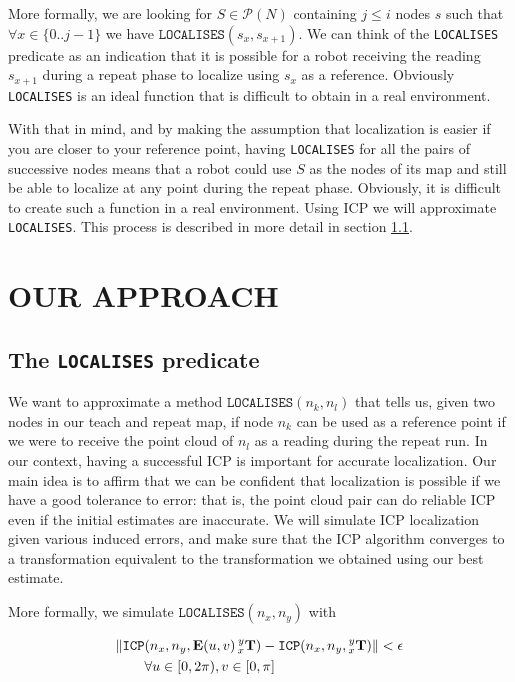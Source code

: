 \documentclass[letterpaper,10 pt,conference]{ieeeconf}
\newcommand{\mat}[1]{\mathbf{#1}}
\begin{document}
More formally, we are looking for $S \in \mathcal{P}(N)$ containing $j \leq i$
nodes $s$ such that $\forall x \in \{ 0..j-1 \}$ we have
$\texttt{LOCALISES}(s_x, s_{x+1})$. We can think of the \texttt{LOCALISES}
predicate as an indication that it is possible for a robot receiving the reading
$s_{x+1}$ during a repeat phase to localize using $s_{x}$ as a reference.
Obviously \texttt{LOCALISES} is an ideal function that is difficult to obtain in
a real environment. 

With that in mind, and by making the assumption that localization is easier if
you are closer to your reference point, having \texttt{LOCALISES} for all the
pairs of successive nodes means that a robot could use $S$ as the nodes of its
map and still be able to localize at any point during the repeat phase.
Obviously, it is difficult to create such a function in a real environment.
Using ICP we will approximate \texttt{LOCALISES}. This process is described in
more detail in section \ref{ssec:localises}.

\section{OUR APPROACH}
\label{approach}

\subsection{The \texttt{LOCALISES} predicate}
\label{ssec:localises}

We want to approximate a method $\texttt{LOCALISES}(n_k, n_l)$ that tells us, given two
nodes in our teach and repeat map, if node $n_k$ can be used as a reference
point if we were to receive the point cloud of $n_l$ as a reading during the
repeat run. In our context, having a successful ICP is important for accurate
localization. Our main idea is to affirm that we can be confident that localization is
possible if we have a good tolerance to error: that is, the point cloud pair can
do reliable ICP even if the initial estimates are inaccurate. We will simulate
ICP localization given various induced errors, and make sure that the ICP
algorithm converges to a transformation equivalent to the transformation we
obtained using our best estimate. 

More formally, we simulate $\texttt{LOCALISES}(n_x, n_y)$ with 

\begin{align}
  \| \texttt{ICP}&(n_x, n_y, \mat{E}(u,v) \prescript{y}{x}{\mat{T}}) - 
\texttt{ICP}(n_x, n_y, \prescript{y}{x}{ \mat{T} }) \| < \epsilon  \\ 
 &\forall u \in [0, 2 \pi),  v \in [0, \pi] \\
\end{align}
\end{document}

